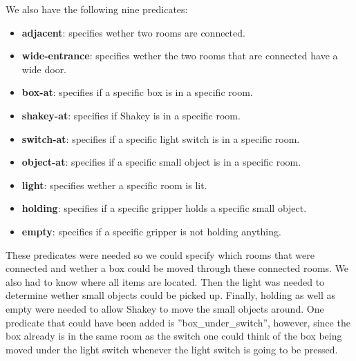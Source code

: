 \documentclass[a4paper,10pt]{article}
\begin{document}
We also have the following nine predicates:
\begin{itemize}
    \item \textbf{adjacent}: specifies wether two rooms are connected.
    \item \textbf{wide-entrance}: specifies wether the two rooms that are connected have a wide door.
    \item \textbf{box-at}: specifies if a specific box is in a specific room.
    \item \textbf{shakey-at}: specifies if Shakey is in a specific room.
    \item \textbf{switch-at}: specifies if a specific light switch is in a specific room.
    \item \textbf{object-at}: specifies if a specific small object is in a specific room.
    \item \textbf{light}: specifies wether a specific room is lit.
    \item \textbf{holding}: specifies if a specific gripper holds a specific small object.
    \item \textbf{empty}: specifies if a specific gripper is not holding anything.
\end{itemize}
These predicates were needed so we could specify which rooms that were connected and wether a box 
could be moved through these connected rooms. 
We also had to know where all items are located. 
Then the light was needed to determine wether small objects could be picked up. 
Finally, holding as well as empty were needed to allow Shakey to move the small objects around.
One predicate that could have been added is ''box\_under\_switch'', however, since the box already is
in the same room as the switch one could think of the box being moved under the light switch whenever
the light switch is going to be pressed.
\end{document}
